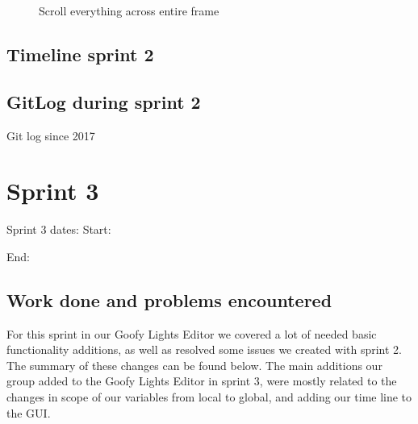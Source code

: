 \documentclass[11pt]{article} %
\begin{document}
{\begin{figure}[H]
	\centering
	\caption{Scroll everything across entire frame}
	\label{fig:UC14}
\end{figure}

\newpage
\subsection{Timeline sprint 2}


\newpage
\subsection{GitLog during sprint 2}
Git log since 2017


\newpage
\section{Sprint 3}
Sprint 3 dates:  Start: \date{4/11/2017}  End: \date{4/19/2017}

\subsection{Work done and problems encountered}
For this sprint in our Goofy Lights Editor we covered a lot of needed basic functionality additions, as well as resolved some issues we created with sprint 2. The summary of these changes can be found below.
The main additions our group added to the Goofy Lights Editor in sprint 3, were mostly related to the changes in scope of our variables from local to global, and adding our time line to the GUI.

}
\end{document}
